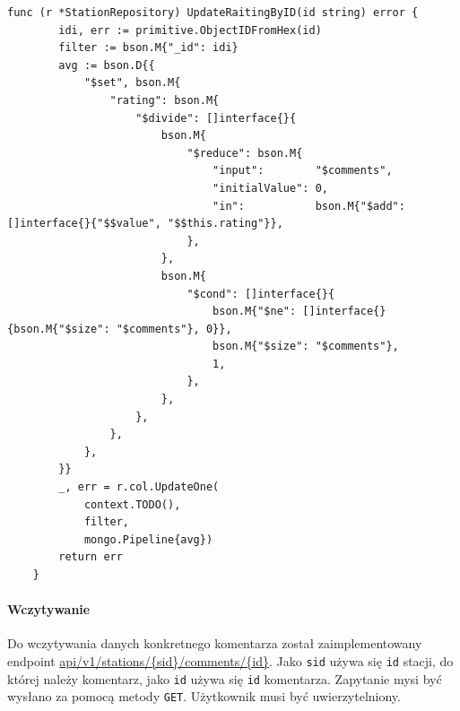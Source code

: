 

\begin{lstlisting}[label=list:update_rating,caption=Aktualizacja oceny stacji,basicstyle=\tiny\ttfamily]
    func (r *StationRepository) UpdateRaitingByID(id string) error {
        idi, err := primitive.ObjectIDFromHex(id)
        filter := bson.M{"_id": idi}
        avg := bson.D{{
            "$set", bson.M{
                "rating": bson.M{
                    "$divide": []interface{}{
                        bson.M{
                            "$reduce": bson.M{
                                "input":        "$comments",
                                "initialValue": 0,
                                "in":           bson.M{"$add": []interface{}{"$$value", "$$this.rating"}},
                            },
                        },
                        bson.M{
                            "$cond": []interface{}{
                                bson.M{"$ne": []interface{}{bson.M{"$size": "$comments"}, 0}},
                                bson.M{"$size": "$comments"},
                                1,
                            },
                        },
                    },
                },
            },
        }}
        _, err = r.col.UpdateOne(
            context.TODO(),
            filter,
            mongo.Pipeline{avg})
        return err
    }
\end{lstlisting}

\paragraph{Wczytywanie\newline}
Do wczytywania danych konkretnego komentarza został zaimplementowany endpoint \url{api/v1/stations/{sid}/comments/{id}}. Jako \texttt{sid} używa się \texttt{id} stacji, do której należy komentarz, jako \texttt{id} używa się \texttt{id} komentarza.
Zapytanie mysi być wysłano za pomocą metody \texttt{GET}. Użytkownik musi być uwierzytelniony.


